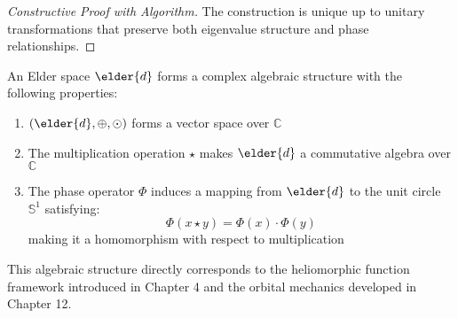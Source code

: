 \begin{proof}[Constructive Proof with Algorithm]
The construction is unique up to unitary transformations that preserve both eigenvalue structure and phase relationships.
\end{proof}

\begin{corollary}
An Elder space $\elder{d}$ forms a complex algebraic structure with the following properties:
\begin{enumerate}
    \item $(\elder{d}, \oplus, \odot)$ forms a vector space over $\mathbb{C}$
    \item The multiplication operation $\star$ makes $\elder{d}$ a commutative algebra over $\mathbb{C}$
    \item The phase operator $\Phi$ induces a mapping from $\elder{d}$ to the unit circle $\mathbb{S}^1$ satisfying:
    \begin{equation}
        \Phi(x \star y) = \Phi(x) \cdot \Phi(y)
    \end{equation}
    making it a homomorphism with respect to multiplication
\end{enumerate}
This algebraic structure directly corresponds to the heliomorphic function framework introduced in Chapter 4 and the orbital mechanics developed in Chapter 12.
\end{corollary}

